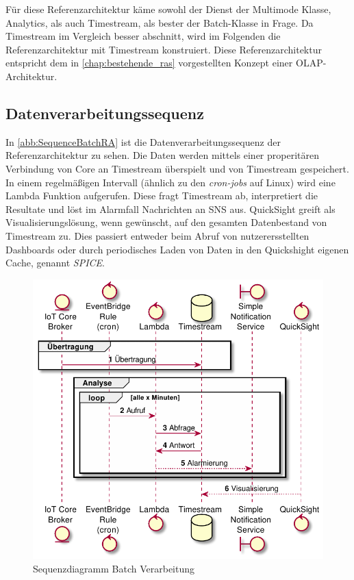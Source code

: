 Für diese Referenzarchitektur käme sowohl der Dienst der Multimode Klasse, \AWSIOT{} Analytics, als auch Timestream, als bester der Batch-Klasse in Frage. Da Timestream im Vergleich besser abschnitt, wird im Folgenden die Referenzarchitektur mit Timestream konstruiert.
Diese Referenzarchitektur entspricht dem in \autoref{chap:bestehende_ras} vorgestellten Konzept einer \ac{OLAP}-Architektur.

\subsection{Datenverarbeitungssequenz}
In \autoref{abb:SequenceBatchRA} ist die Datenverarbeitungssequenz der Referenzarchitektur zu sehen. Die Daten werden mittels einer properitären Verbindung von \AWSIOT{} Core an Timestream überspielt und von Timestream gespeichert. In einem regelmäßigen Intervall (ähnlich zu den \textit{cron-jobs} auf Linux) wird eine Lambda Funktion aufgerufen. Diese fragt Timestream ab, interpretiert die Resultate und löst im Alarmfall Nachrichten an \ac{SNS} aus. QuickSight greift als Visualisierungslösung, wenn gewünscht, auf den gesamten Datenbestand von Timestream zu. Dies passiert entweder beim Abruf von nutzerersstellten Dashboards oder durch periodisches Laden von Daten in den Quickshight eigenen Cache, genannt \textit{SPICE}.
\begin{figure}[H]
\centering
\includegraphics[width=\textwidth]{graphics/batch-ra.pdf}
\caption{Sequenzdiagramm Batch Verarbeitung}
\label{abb:SequenceBatchRA}
\end{figure}



